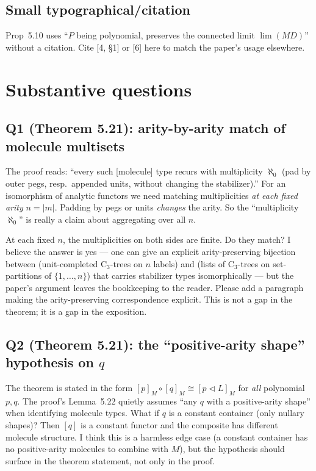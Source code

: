 \documentclass[11pt]{article}
\begin{document}
\subsection{Small typographical/citation}

Prop~5.10 uses ``$P$ being polynomial, preserves the connected limit $\lim(MD)$'' without a citation. Cite [4, §1] or [6] here to match the paper's usage elsewhere.

\section{Substantive questions}

\subsection*{Q1 (Theorem 5.21): arity-by-arity match of molecule multisets}

The proof reads: ``every such [molecule] type recurs with multiplicity $\aleph_0$ (pad by outer pegs, resp.~appended units, without changing the stabilizer).'' For an isomorphism of analytic functors we need matching multiplicities \emph{at each fixed arity} $n = |m|$. Padding by pegs or units \emph{changes} the arity. So the ``multiplicity $\aleph_0$'' is really a claim about aggregating over all $n$.

At each fixed $n$, the multiplicities on both sides are finite. Do they match? I believe the answer is yes — one can give an explicit arity-preserving bijection between (unit-completed C$_3$-trees on $n$ labels) and (lists of C$_3$-trees on set-partitions of $\{1,\dots,n\}$) that carries stabilizer types isomorphically — but the paper's argument leaves the bookkeeping to the reader. Please add a paragraph making the arity-preserving correspondence explicit. This is not a gap in the theorem; it is a gap in the exposition.

\subsection*{Q2 (Theorem 5.21): the ``positive-arity shape'' hypothesis on $q$}

The theorem is stated in the form $[p]_M \circ [q]_M \cong [p \triangleleft L]_M$ for \emph{all} polynomial $p, q$. The proof's Lemma~5.22 quietly assumes ``any $q$ with a positive-arity shape'' when identifying molecule types. What if $q$ is a constant container (only nullary shapes)? Then $[q]$ is a constant functor and the composite has different molecule structure. I think this is a harmless edge case (a constant container has no positive-arity molecules to combine with $M$), but the hypothesis should surface in the theorem statement, not only in the proof.
\end{document}
